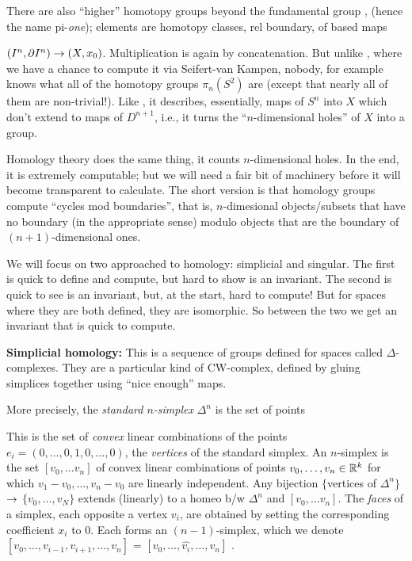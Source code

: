 \msk

There are also ``higher'' homotopy groups beyond the fundamental group \mpu ,
(hence the name pi-{\it one}); elements are homotopy classes, rel boundary, 
of based maps 

$(I^n,\partial I^n)\rightarrow(X,x_0)$. Multiplication is again by
concatenation. But unlike \mpu , where we have a chance to compute it
via Seifert-van Kampen, nobody, for example knows what all of the 
homotopy groups $\pi_n(S^2)$ are (except that nearly all of them are
non-trivial!). Like \mpu, it describes, essentially, maps of $S^n$ into
$X$ which don't extend to maps of $D^{n+1}$, i.e., it turns the ``$n$-dimensional
holes'' of $X$ into a group.

\vfill
\eject

Homology theory does the same thing, it counts $n$-dimensional holes.
In the end, it is extremely computable; but we will need
a fair bit of machinery before it will become transparent to
calculate. The short version is that homology groups compute
``cycles mod boundaries'', that is, $n$-dimesional objects/subsets that
have no boundary (in the appropriate sense) modulo objects that are the
boundary of $(n+1)$-dimensional ones. 

\ssk

We will focus on two approached to homology: simplicial and singular.
The first is quick to define and compute, but hard to show is an invariant.
The second is quick to see is an invariant, but, at the start, hard
to compute! But for spaces where they are both defined, they are
isomorphic. So between the two we get an invariant that is quick to compute.

\msk

{\bf Simplicial homology:} This is a sequence of groups defined for spaces
called $\Delta$-complexes. They are a particular kind of CW-complex,
defined by gluing simplices together using ``nice enough'' maps. 

\ssk

More precisely, the {\it standard $n$-simplex} $\Delta^n$ is
the set of points 


 This is the set of {\it convex} linear combinations
of the points
$e_i=(0,\ldots ,0,1,0,\ldots ,0)$, the {\it vertices} of the standard
simplex. An $n$-simplex is the set $[v_0,\ldots v_n]$ of
convex linear combinations of points $v_0,\ldots ,v_n\in{\Bbb R}^{k}$
for which $v_1-v_0,\ldots ,v_n-v_0$ are linearly independent.
Any bijection $\{$vertices of $\Delta^n\}$ $\rightarrow$
$\{v_0,\ldots ,v_N\}$ extends (linearly) to a homeo b/w
$\Delta^n$ and $[v_0,\ldots v_n]$. The {\it faces} of a simplex, each opposite
a vertex $v_i$, are obtained by setting the corresponding coefficient $x_i$ to $0$. 
Each forms an $(n-1)$-simplex, which we denote 
$[v_0,\ldots,v_{i-1},v_{i+1},\ldots ,v_n]$ =
$[v_0,\ldots,\widehat{v_{i}},\ldots ,v_n]$ . 

